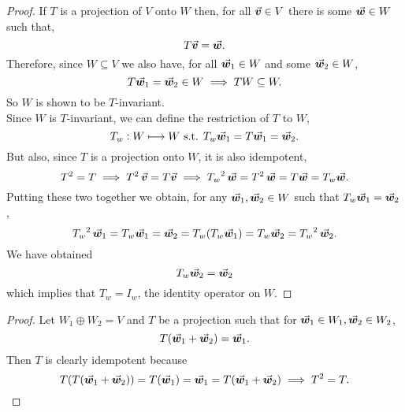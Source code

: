 \documentclass[../MathsNotesBase.tex]{subfiles}
\begin{document}
{	\bigskip	
	\begin{proof}
		If $T$ is a projection of $V$ onto $W$ then, for all ${ \vec{\bm{v}} \in V }$ there is some ${ \vec{\bm{w}} \in W }$ such that,
		\[ T\vec{\bm{v}} = \vec{\bm{w}}. \]
		Therefore, since ${ W \subseteq V }$ we also have, for all ${ \vec{\bm{w}}_1 \in W }$ and some ${ \vec{\bm{w}}_2 \in W }$,
		\[ T\vec{\bm{w}}_1 = \vec{\bm{w}}_2 \in W \implies TW \subseteq W. \]
		So $W$ is shown to be $T$-invariant.\\
		
		Since $W$ is $T$-invariant, we can define the restriction of $T$ to $W$,
		\[ T_w : W \longmapsto W \text{ s.t. } T_w\vec{\bm{w}}_1 = T\vec{\bm{w}}_1 = \vec{\bm{w}}_2. \]
		But also, since $T$ is a projection onto $W$, it is also idempotent,
		\[ T^2 = T \implies T^2\,\vec{\bm{v}} = T\vec{\bm{v}} \implies {T_w}^2\,\vec{\bm{w}} = T^2\,\vec{\bm{w}} = T\vec{\bm{w}} = T_w\vec{\bm{w}}. \]
		Putting these two together we obtain, for any ${ \vec{\bm{w}}_1,\vec{\bm{w}}_2 \in W }$ such that ${ T_w\vec{\bm{w}}_1 = \vec{\bm{w}}_2 }$,
		\[ {T_w}^2\,\vec{\bm{w}}_1 = T_w\vec{\bm{w}}_1 = \vec{\bm{w}}_2 = T_w(T_w\vec{\bm{w}}_1) = T_w\vec{\bm{w}}_2 = {T_w}^2\,\vec{\bm{w}}_2. \]
		We have obtained 
		\[ T_w\vec{\bm{w}}_2 = \vec{\bm{w}}_2 \]
		which implies that ${ T_w = I_w }$, the identity operator on $W$.
	\end{proof}


	\bigskip
	\begin{proof}
		Let ${ W_1 \oplus W_2 = V }$ and $T$ be a projection such that for ${ \vec{\bm{w}}_1 \in W_1, \vec{\bm{w}}_2 \in W_2 }$,
		\[ T(\vec{\bm{w}}_1 + \vec{\bm{w}}_2) = \vec{\bm{w}}_1. \]
		Then $T$ is clearly idempotent because
		\[ T(T(\vec{\bm{w}}_1 + \vec{\bm{w}}_2)) = T(\vec{\bm{w}}_1) = \vec{\bm{w}}_1 = T(\vec{\bm{w}}_1 + \vec{\bm{w}}_2) \implies T^2 = T. \]
		

\end{proof}}
\end{document}
